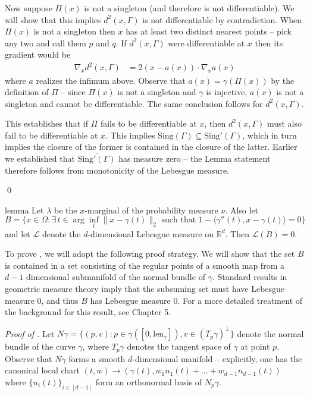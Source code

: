 \documentclass[11pt]{article}
\begin{document}
Now suppose $\Pi(x)$ is not a singleton (and therefore is not differentiable). We will show that this implies $d^2(x,\Gamma)$ is not differentiable by contradiction. When $\Pi(x)$ is not a singleton then $x$ has at least two distinct nearest points -- pick any two and call them $p$ and $q$. If $d^2(x,\Gamma)$ were differentiable at $x$ then its gradient would be 
\begin{align}
    \nabla_xd^2(x, \Gamma) &= 2(x - a(x))\cdot \nabla_xa(x)
\end{align}
where $a$ realizes the infimum above. Observe that $a(x) = \gamma(\Pi(x))$ by the definition of $\Pi$ -- since $\Pi(x)$ is not a singleton and $\gamma$ is injective, $a(x)$ is not a singleton and cannot be differentiable. The same conclusion follows for $d^2(x, \Gamma).$

This establishes that if $\Pi$ fails to be differentiable at $x$, then $d^2(x, \Gamma)$ must also fail to be differentiable at $x$. This implies $\text{Sing}(\Gamma) \subseteq \text{Sing}'(\Gamma)$, which in turn implies the closure of the former is contained in the closure of the latter. Earlier we established that $\overline{\text{Sing}'(\Gamma)}$ has measure zero -- the Lemma statement therefore follows from monotonicity of the Lebesgue measure.

\qed{}

\begin{restatable}{lemma}{} \label{lemma: IFT degen}
    Let $\lambda$ be the $x$-marginal of the probability measure $\nu$. Also let
    \begin{equation} 
    B= \{x \in \Omega : \exists \,t \in \arg\inf_t \|x-\gamma(t)\|_2 \text{ such that } 1 - \langle\gamma''(t), x-\gamma(t)\rangle = 0 \} \label{eq: ift degeneracy set}
    \end{equation}
    and let $\mathcal{L}$ denote the $d$-dimensional Lebesgue measure on $\mathbb{R}^d$. Then $\mathcal{L}(B) = 0.$
\end{restatable}
\noindent To prove , we will adopt the following proof strategy. We will show that the set $B$ is contained in a set consisting of the regular points of a smooth map from a $d-1$ dimensional submanifold of the normal bundle of $\gamma$. Standard results in geometric measure theory imply that the subsuming set must have Lebesgue measure $0$, and thus $B$ has Lebesgue measure $0$. For a more detailed treatment of the background for this result, see \citet{lee2003smooth} Chapter 5. 

\textit{Proof of .} Let $N\gamma = \{(p, v) : p \in \gamma([0, \text{len}_{\gamma}]), v \in (T_p \gamma)^{\bot}\}$ denote the normal bundle of the curve $\gamma$, where $T_p\gamma$ denotes the tangent space of $\gamma$ at point $p$. Observe that $N\gamma$ forms a smooth $d$-dimensional manifold -- explicitly, one has the canonical local chart $(t,w) \rightarrow (\gamma(t), w_1n_1(t) + \dots+w_{d-1}n_{d-1}(t))$ where $\{n_i(t)\}_{i\in [d-1]}$ form an orthonormal basis of $N_p\gamma$. 
\end{document}
